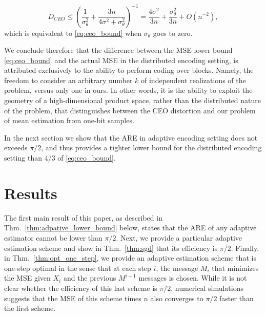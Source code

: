 \documentclass[letterpaper, conference]{IEEEtran}      %
\begin{document}
\[
D_{CEO} \leq  \left( \frac{1}{\sigma_\theta^2} +  \frac{3n}{4\sigma^2 + \sigma_\theta^2} \right)^{-1}   =
\frac{4 \sigma^2}{3n} +  \frac{\sigma_\theta^2}{3n} + O(n^{-2}),
\]
which is equivalent to \eqref{eq:ceo_bound} when $\sigma_\theta$ goes to zero. \par
We conclude therefore that the difference between the MSE lower bound \eqref{eq:ceo_bound} and the actual MSE in the distributed encoding setting, is attributed exclusively to the ability to perform coding over blocks. Namely, the freedom to consider an arbitrary number $k$ of independent realizations of the problem, versus only one in ours. In other words, it is the ability to exploit the geometry of a high-dimensional product space, rather than the distributed nature of the problem, that distinguishes between the CEO distortion and our problem of mean estimation from one-bit samples.\par
In the next section we show that the ARE in adaptive encoding setting does not exceeds $\pi/2$, and thus provides a tighter lower bound for the distributed encoding setting than $4/3$ of  \eqref{eq:ceo_bound}. 

\section{Results \label{sec:sequential}}
The first main result of this paper, as described in Thm.~\ref{thm:adpative_lower_bound} below, states that the ARE of any adaptive estimator cannot be lower than $\pi/2$. Next, we provide a particular adaptive estimation scheme and show in Thm.~\ref{thm:sgd} that its efficiency is $\pi/2$. Finally, in Thm.~\ref{thm:opt_one_step}, we provide an adaptive estimation scheme that is one-step optimal in the sense that at each step $i$, the message $M_i$ that minimizes the MSE given $X_i$ and the previous $M^{i-1}$ messages is chosen. While it is not clear whether the efficiency of this last scheme is $\pi/2$, numerical simulations suggests that the MSE of this scheme times $n$ also converges to $\pi/2$ faster than the first scheme.

%  
%
%
%
%  
\end{document}
